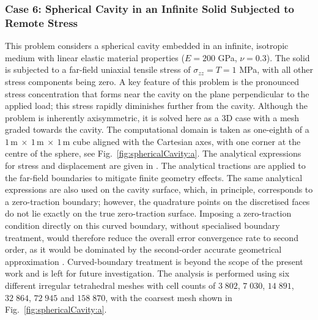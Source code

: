 \documentclass[review,3p]{elsarticle}
\begin{document}
\subsubsection{Case 6: Spherical Cavity in an Infinite Solid Subjected to Remote Stress}
\label{case:sphericalCavity}
%
This problem considers a spherical cavity embedded in an infinite, isotropic medium with linear elastic material properties ($E = 200$ GPa, $\nu = 0.3$).
The solid is subjected to a far-field uniaxial tensile stress of $\sigma_{zz} = T = 1$ MPa, with all other stress components being zero.
A key feature of this problem is the pronounced stress concentration that forms near the cavity on the plane perpendicular to the applied load; this stress rapidly diminishes further from the cavity. 
Although the problem is inherently axisymmetric, it is solved here as a 3D case with a mesh graded towards the cavity.
The computational domain is taken as one-eighth of a $1\,\text{m}~\times~1\,\text{m}~\times~1\,\text{m}$ cube aligned with the Cartesian axes, with one corner at the centre of the sphere, see Fig.~\ref{fig:sphericalCavity:a}.
The analytical expressions for stress \cite{Southwell1926} and displacement \cite{Goodier1933} are given in \cite{Cardiff2026}.
The analytical tractions are applied to the far-field boundaries to mitigate finite geometry effects. 
The same analytical expressions are also used on the cavity surface, which, in principle, corresponds to a zero-traction boundary; however, the quadrature points on the discretised faces do not lie exactly on the true zero-traction surface. Imposing a zero-traction condition directly on this curved boundary, without specialised boundary treatment, would therefore reduce the overall error convergence rate to second order, as it would be dominated by the second-order accurate geometrical approximation \cite{costa2021, Gooch2002}.  
Curved-boundary treatment is beyond the scope of the present work and is left for future investigation.
The analysis is performed using six different irregular tetrahedral meshes with cell counts of $3\;802$, $7\;030$, $14\;891$, $32\;864$, $72\;945$ and $158\;870$, with the coarsest mesh shown in Fig.~\ref{fig:sphericalCavity:a}.
\end{document}
